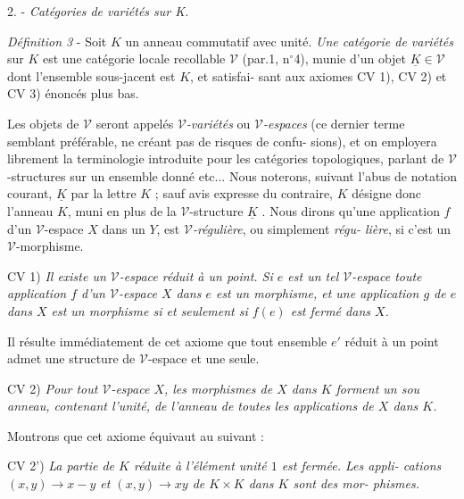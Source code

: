 \newpage



2. - \emph{Catégories de variétés sur K.}

\emph{Définition 3} - Soit $K$ un anneau commutatif avec unité. \emph{Une catégorie de
variétés} sur $K$ est une catégorie locale recollable $\mathcal{V}$ (par.1, n$^\circ$4),
munie d'un objet $\underline{K} \in \mathcal{V}$ dont l'ensemble sous-jacent est $K$, et satisfai-
sant aux axiomes CV 1), CV 2) et CV 3) énoncés plus bas.

Les objets de $\mathcal{V}$ seront appelés \emph{$\mathcal{V}$-variétés} ou \emph{$\mathcal{V}$-espaces} (ce
dernier terme semblant préférable, ne créant pas de risques de confu-
sions), et on employera librement la terminologie introduite pour les
catégories topologiques, parlant de $\mathcal{V}$-structures sur un ensemble donné
etc... Nous noterons, suivant l'abus de notation courant, $\underline{K}$ par la
lettre $K$ ; sauf avis expresse du contraire, $K$ désigne donc l'anneau $K$,
muni en plus de la $\mathcal{V}$-structure $\underline{K}$ . Nous dirons qu'une application $f$
d'un $\mathcal{V}$-espace $X$ dans un $Y$, est \emph{$\mathcal{V}$-régulière}, ou simplement \emph{régu-
lière}, si c'est un $\mathcal{V}$-morphisme.

CV 1) \emph{Il existe un $\mathcal{V}$-espace réduit à un point. Si $e$ est un tel $\mathcal{V}$-espace
toute application $f$ d'un $\mathcal{V}$-espace $X$ dans $e$ est un morphisme, et
une application $g$ de $e$ dans $X$ est un morphisme si et seulement si
$f(e)$ est fermé dans $X$.}

Il résulte immédiatement de cet axiome que tout ensemble $e'$ réduit à un
point admet une structure de $\mathcal{V}$-espace et une seule.

CV 2) \emph{Pour tout $\mathcal{V}$-espace $X$, les morphismes de $X$ dans $K$ forment un sou
anneau, contenant l'unité, de l'anneau de toutes les applications
de $X$ dans $K$.}

Montrons que cet axiome équivaut au suivant :

CV 2') \emph{La partie de $K$ réduite à l'élément unité $1$ est fermée. Les appli-
cations $(x,y) \to x-y$ et $(x,y) \to xy$ de $K \times K$ dans $K$ sont des mor-
phismes.}

\newpage



